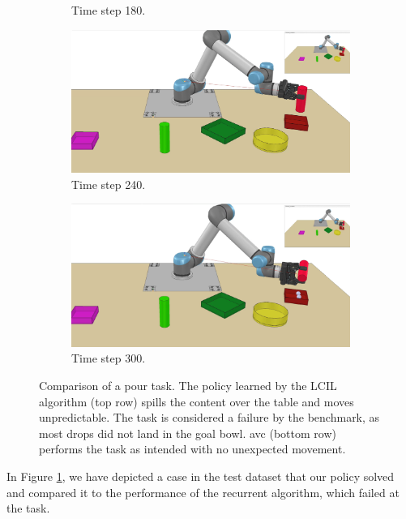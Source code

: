 \begin{figure}
\begin{subfigure}[t]{0.18\textwidth}
        \caption{Time step 180.}
    \end{subfigure}
    \begin{subfigure}[t]{0.18\textwidth}
        \includegraphics[width=\linewidth]{images/Language_Conditioned_Exp/mine_4.png}
        \caption{Time step 240.}
    \end{subfigure}
    \begin{subfigure}[t]{0.18\textwidth}
        \includegraphics[width=\linewidth]{images/Language_Conditioned_Exp/mine_5.png}
        \caption{Time step 300.}
    \end{subfigure}
    \caption{Comparison of a pour task. The policy learned by the LCIL algorithm (top row) spills the content over the table and moves unpredictable. The task is considered a failure 
    by the benchmark, as most drops did not land in the goal bowl. \ac{avc} (bottom row) performs the task as intended with no unexpected movement.}
    \label{fig: AVC vs. Rec}
\end{figure}
In Figure \ref{fig: AVC vs. Rec}, we have depicted a case in the test dataset that our policy solved and compared it to the performance 
of the recurrent algorithm, which failed at the task. \\

